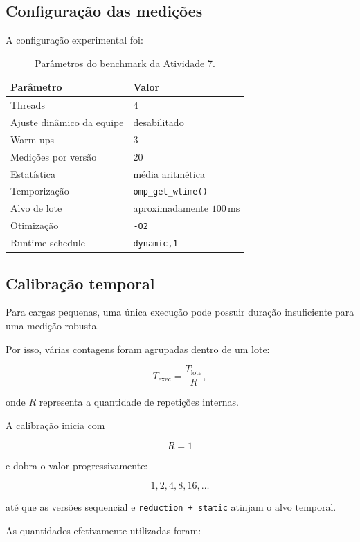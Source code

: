 \subsection{Configuração das medições}

A configuração experimental foi:

\begin{table}[htbp]
\centering
\caption{Parâmetros do benchmark da Atividade 7.}
\label{tab:atvd07-config}
\begin{tabular}{|l|l|}
\hline
\textbf{Parâmetro} & \textbf{Valor} \\
\hline
Threads & 4 \\
\hline
Ajuste dinâmico da equipe & desabilitado \\
\hline
Warm-ups & 3 \\
\hline
Medições por versão & 20 \\
\hline
Estatística & média aritmética \\
\hline
Temporização & \texttt{omp\_get\_wtime()} \\
\hline
Alvo de lote & aproximadamente \(100\,\mathrm{ms}\) \\
\hline
Otimização & \texttt{-O2} \\
\hline
Runtime schedule & \texttt{dynamic,1} \\
\hline
\end{tabular}
\end{table}


\subsection{Calibração temporal}

Para cargas pequenas, uma única execução pode possuir duração insuficiente
para uma medição robusta.

Por isso, várias contagens foram agrupadas dentro de um lote:

\[
T_{\mathrm{exec}}
=
\frac{T_{\mathrm{lote}}}{R},
\]

onde \(R\) representa a quantidade de repetições internas.

A calibração inicia com

\[
R=1
\]

e dobra o valor progressivamente:

\[
1,2,4,8,16,\ldots
\]

até que as versões sequencial e \texttt{reduction + static} atinjam o alvo
temporal.

As quantidades efetivamente utilizadas foram:


